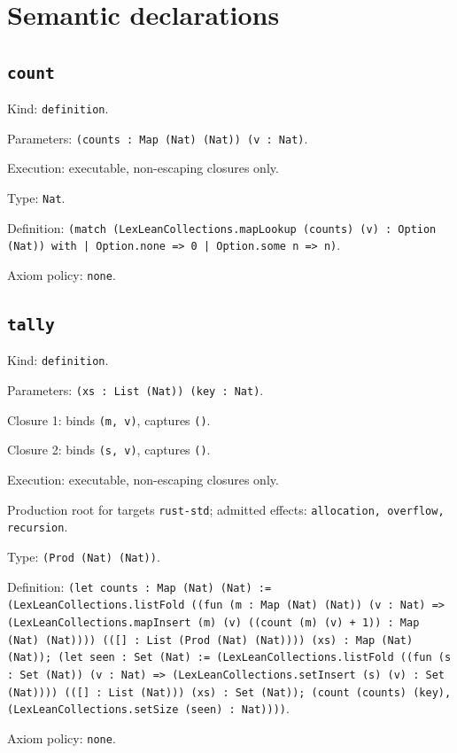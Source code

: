 \documentclass[11pt]{article}
\begin{document}
\section*{Semantic declarations}
\subsection*{\texttt{count}}
\noindent Kind: \texttt{definition}.\par
\noindent Parameters: \texttt{(counts : Map (Nat) (Nat)) (v : Nat)}.\par
\noindent Execution: executable, non-escaping closures only.\par
\noindent Type: \texttt{Nat}.\par
\noindent Definition: \texttt{(match (LexLeanCollections.mapLookup (counts) (v) : Option (Nat)) with | Option.none => 0 | Option.some n => n)}.\par
\noindent Axiom policy: \texttt{none}.\par
\subsection*{\texttt{tally}}
\noindent Kind: \texttt{definition}.\par
\noindent Parameters: \texttt{(xs : List (Nat)) (key : Nat)}.\par
\noindent Closure 1: binds \texttt{(m, v)}, captures \texttt{()}.\par
\noindent Closure 2: binds \texttt{(s, v)}, captures \texttt{()}.\par
\noindent Execution: executable, non-escaping closures only.\par
\noindent Production root for targets \texttt{rust-std}; admitted effects: \texttt{allocation, overflow, recursion}.\par
\noindent Type: \texttt{(Prod (Nat) (Nat))}.\par
\noindent Definition: \texttt{(let counts : Map (Nat) (Nat) := (LexLeanCollections.listFold ((fun (m : Map (Nat) (Nat)) (v : Nat) => (LexLeanCollections.mapInsert (m) (v) ((count (m) (v) + 1)) : Map (Nat) (Nat)))) (([] : List (Prod (Nat) (Nat)))) (xs) : Map (Nat) (Nat)); (let seen : Set (Nat) := (LexLeanCollections.listFold ((fun (s : Set (Nat)) (v : Nat) => (LexLeanCollections.setInsert (s) (v) : Set (Nat)))) (([] : List (Nat))) (xs) : Set (Nat)); (count (counts) (key), (LexLeanCollections.setSize (seen) : Nat))))}.\par
\noindent Axiom policy: \texttt{none}.\par
\end{document}
